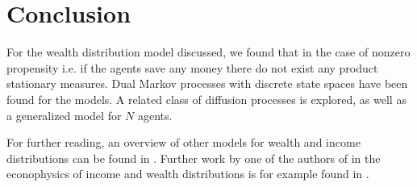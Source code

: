 \documentclass{article}
\begin{document}






\section*{Conclusion}
For the wealth distribution model discussed, we found that in the case of nonzero propensity i.e. if the agents save any money there do not exist any product stationary measures. Dual Markov processes with discrete state spaces have been found for the models. A related class of diffusion processes is explored, as well as a generalized model for $N$ agents.

For further reading, an overview of other models for wealth and income distributions can be found in \cite{chakrabarti2013econophysics}. Further work by one of the authors of \cite{cirillo2014duality} in the econophysics of income and wealth distributions is for example found in \cite{redig2015multilinearity,  redig2017generalized, 2016JSP...163...92V}.

\printbibliography
\end{document}
